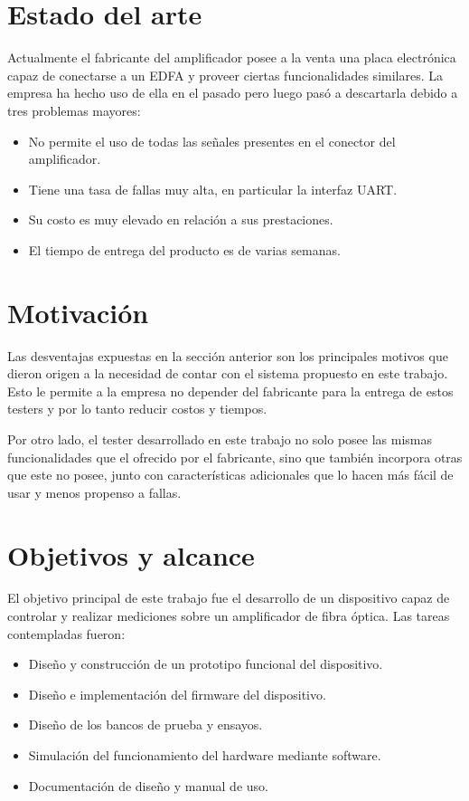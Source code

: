 \section{Estado del arte}

Actualmente el fabricante del amplificador posee a la venta una placa electrónica capaz de conectarse a un EDFA y proveer ciertas funcionalidades similares. La empresa ha hecho uso de ella en el pasado pero luego pasó a descartarla debido a tres problemas mayores:

\begin{itemize}
\item No permite el uso de todas las señales presentes en el conector del amplificador.
\item Tiene una tasa de fallas muy alta, en particular la interfaz UART.
\item Su costo es muy elevado en relación a sus prestaciones.
\item El tiempo de entrega del producto es de varias semanas.
\end{itemize}


\section{Motivación}

Las desventajas expuestas en la sección anterior son los principales motivos que dieron origen a la necesidad de contar con el sistema propuesto en este trabajo. Esto le permite a la empresa no depender del fabricante para la entrega de estos testers y por lo tanto reducir costos y tiempos.

Por otro lado, el tester desarrollado en este trabajo no solo posee las mismas funcionalidades que el ofrecido por el fabricante, sino que también incorpora otras que este no posee, junto con características adicionales que lo hacen más fácil de usar y menos propenso a fallas.


\section{Objetivos y alcance}

El objetivo principal de este trabajo fue el desarrollo de un dispositivo capaz de controlar y realizar mediciones sobre un amplificador de fibra óptica. Las tareas contempladas fueron:

\begin{itemize}
\item Diseño y construcción de un prototipo funcional del dispositivo.
\item Diseño e implementación del firmware del dispositivo.
\item Diseño de los bancos de prueba y ensayos.
\item Simulación del funcionamiento del hardware mediante software.
\item Documentación de diseño y manual de uso.
\end{itemize}

